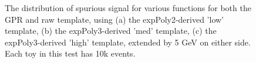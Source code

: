 \begin{figure} 
\begin{center}

\caption{The distribution of spurious signal for various functions for both the GPR and raw template, using (a) the expPoly2-derived 'low' template, (b) the expPoly3-derived 'med' template, (c) the expPoly3-derived 'high' template, extended by 5 GeV on either side. Each toy in this test has 10k events.}
\label{fig:padded_lowpt_10k_noSig}
\end{center}
\end{figure}

